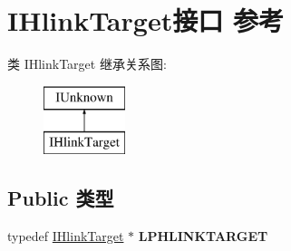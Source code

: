 \hypertarget{interface_i_hlink_target}{}\section{I\+Hlink\+Target接口 参考}
\label{interface_i_hlink_target}
类 I\+Hlink\+Target 继承关系图\+:\begin{figure}[H]
\begin{center}
\leavevmode
\includegraphics[height=2.000000cm]{interface_i_hlink_target}
\end{center}
\end{figure}
\subsection*{Public 类型}
\begin{DoxyCompactItemize}
\item 
\mbox{\label{interface_i_hlink_target_a4710218675193b2ed55da2d7ed96f151}} 
typedef \hyperlink{interface_i_hlink_target}{I\+Hlink\+Target} $\ast$ {\bfseries L\+P\+H\+L\+I\+N\+K\+T\+A\+R\+G\+ET}
\end{DoxyCompactItemize}
